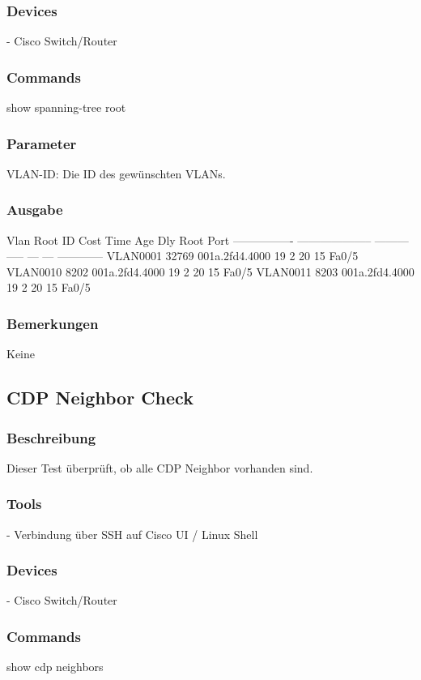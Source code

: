 \documentclass[a4,12pt]{scrartcl}
\begin{document}
\subsubsection{Devices}
- Cisco Switch/Router
\subsubsection{Commands}
show spanning-tree root
\subsubsection{Parameter}
VLAN-ID: Die ID des gewünschten VLANs.
\subsubsection{Ausgabe}
Vlan                   Root ID          Cost    Time  Age Dly  Root Port\newline
---------------- -------------------- --------- ----- --- ---  ------------\newline
VLAN0001         32769 001a.2fd4.4000        19    2   20  15  Fa0/5\newline
VLAN0010          8202 001a.2fd4.4000        19    2   20  15  Fa0/5\newline
VLAN0011          8203 001a.2fd4.4000        19    2   20  15  Fa0/5\newline
\subsubsection{Bemerkungen}
Keine



\subsection{CDP Neighbor Check}
\subsubsection{Beschreibung}
Dieser Test überprüft, ob alle CDP Neighbor vorhanden sind.
\subsubsection{Tools}
- Verbindung über SSH auf Cisco UI / Linux Shell
\subsubsection{Devices}
- Cisco Switch/Router
\subsubsection{Commands}
show cdp neighbors
\end{document}
